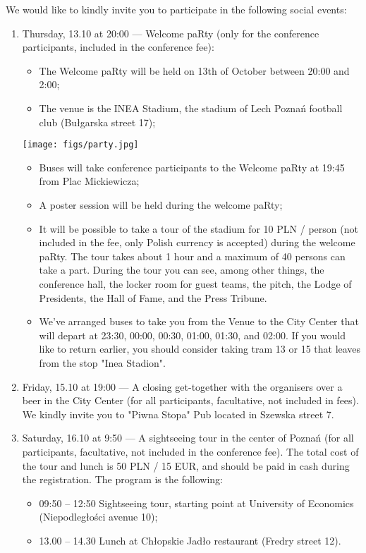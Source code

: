 We would like to kindly invite you to participate in the following social events:

\begin{enumerate}
        \item Thursday, 13.10 at 20:00 — Welcome paRty (only for the conference participants, included in the conference fee):
        
        \begin{itemize}
                \item The Welcome paRty will be held on 13th of October between 20:00 and 2:00;
                \item The venue is the INEA Stadium, the stadium of Lech Poznań football club (Bułgarska street 17);
        \end{itemize}
        
\begin{center}
\texttt{[image: figs/party.jpg]}
\end{center}

        \begin{itemize}
                \item Buses will take conference participants to the Welcome paRty at 19:45 from Plac Mickiewicza;
                \item A poster session will be held during the welcome paRty;
                \item It will be possible to take a tour of the stadium for 10 PLN / person (not included in the fee, only Polish currency is accepted) during the welcome paRty. The tour takes about 1 hour and a maximum of 40 persons can take a part. During the tour you can see, among other things, the conference hall, the locker room for guest teams, the pitch, the Lodge of Presidents, the Hall of Fame, and the Press Tribune.
                \item We've arranged buses to take you from the Venue to the City Center that will depart at 23:30, 00:00, 00:30, 01:00, 01:30, and 02:00. If you would like to return earlier, you should consider taking tram 13 or 15 that leaves from the stop "Inea Stadion". 
        \end{itemize}
        
        \item Friday, 15.10 at 19:00 — A closing get-together with the organisers over a beer in the City Center (for all participants, facultative, not included in fees). We kindly invite you to "Piwna Stopa" Pub located in Szewska street 7.
        \item Saturday, 16.10 at 9:50 — A sightseeing tour in the center of Poznań (for all participants, facultative, not included in the conference fee). The total cost of the tour and lunch is 50 PLN / 15 EUR, and should be paid in cash during the registration. The program is the following:
        
        \begin{itemize}
                \item 09:50 – 12:50 Sightseeing tour, starting point at University of Economics (Niepodległości avenue 10);
                \item 13.00 – 14.30 Lunch at Chłopskie Jadło restaurant (Fredry street 12).
        \end{itemize}

\end{enumerate}
